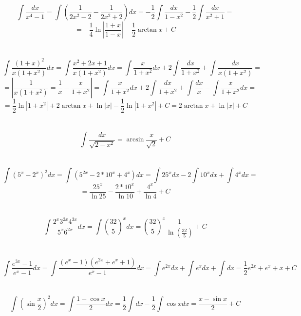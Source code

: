 \section{}
    \[\int \frac{dx}{x^4 - 1} = \int \left(\frac{1}{2x^2 - 2}
    - \frac{1}{2x^2 + 2}\right)dx = - \frac{1}{2} \int \frac{dx}{1 - x^2}
    - \frac{1}{2} \int \frac{dx}{x^2 + 1} =\] 
    \[= - \frac{1}{4} \ln{\left| \frac{1 + x}{1 - x} \right|} -
    \frac{1}{2} \arctan{x} + C\]

\section{}
    \[\int \frac{(1 + x)^2}{x(1 + x^2)}dx = \int 
    \frac{x^2 + 2x + 1}{x(1 + x^2)}dx = \int \frac{x}{1 + x^2}dx
    + 2 \int \frac{dx}{1 + x^2} + \int \frac{dx}{x(1 + x^2)} =\]
    \[= \left| \frac{1}{x(1 + x^2)} = \frac{1}{x} - \frac{x}{1 + x^2}
    \right| = \int \frac{x}{1 + x^2}dx + 2 \int \frac{dx}{1 + x^2} +
    \int \frac{dx}{x} - \int \frac{x}{1 + x^2}dx =\]
    \[= \frac{1}{2} \ln{|1 + x^2|} + 2 \arctan{x} + \ln{|x|}
    - \frac{1}{2} \ln{|1 + x^2|} + C = 2 \arctan{x} + \ln{|x|} + C\]

\section{}
    \[\int \frac{dx}{\sqrt{2 - x^2}} = \arcsin{\frac{x}{\sqrt{2}} + C}\]
            
\section{}
    \[\int (5^x - 2^x)^2 dx = \int (5^{2x} - 2 * 10^x + 4^x)dx =
    \int 25^x dx - 2 \int 10^x dx + \int 4^x dx = \] 
    \[= \frac{25^x}{\ln{25}} - \frac{2 * 10^x}{\ln{10}} + 
    \frac{4^x}{\ln{4}} + C\]    

\section{}
    \[\int \frac{2^x 3^{2x} 4^{3x}}{5^x 6^{2x}}dx = \int
    \left(\frac{32}{5}\right)^x dx = \left(\frac{32}{5}\right)^x
    \frac{1}{\ln{\left(\frac{32}{5}\right)}} + C\]
            
\section{}
    \[\int \frac{e^{3x} - 1}{e^x - 1}dx =
    \int \frac{(e^x - 1)(e^{2x} + e^x + 1)}{e^x - 1}dx
    = \int e^{2x}dx + \int e^x dx + \int dx = 
    \frac{1}{2} e^{2x} + e^x + x + C\]
            
\section{}
    \[\int \left(\sin{\frac{x}{2}}\right)^2 dx = \int \frac{1 - \cos{x}}{2}dx =
    \frac{1}{2} \int dx - \frac{1}{2} \int \cos{x}dx =
    \frac{x - \sin{x}}{2} + C\] 